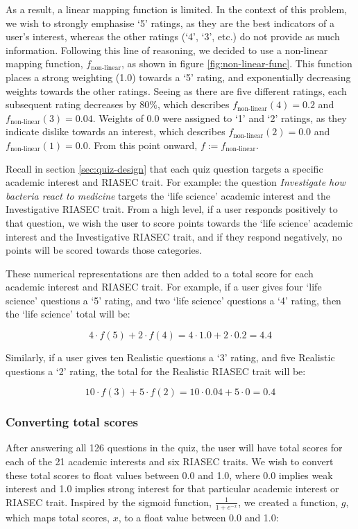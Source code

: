 As a result, a linear mapping function is limited.
In the context of this problem, we wish to strongly emphasise `5' ratings, as they are the best indicators of a user's interest,
whereas the other ratings (`4', `3', etc.) do not provide as much information.
Following this line of reasoning, we decided to use a non-linear mapping function, $f_{\text{non-linear}}$, as shown in figure \ref{fig:non-linear-func}.
This function places a strong weighting (1.0) towards a `5' rating, 
and exponentially decreasing weights towards the other ratings.
Seeing as there are five different ratings, each subsequent rating decreases by 80\%,
which describes $f_{\text{non-linear}}(4)=0.2$ and $f_{\text{non-linear}}(3)=0.04$.
Weights of $0.0$ were assigned to `1' and `2' ratings, as they indicate dislike towards an interest, 
which describes $f_{\text{non-linear}}(2)=0.0$ and $f_{\text{non-linear}}(1)=0.0$.
From this point onward, $f := f_{\text{non-linear}}$.

Recall in section \ref{sec:quiz-design} that each quiz question targets a specific academic interest and RIASEC trait.
For example: the question \emph{Investigate how bacteria react to medicine} targets the `life science' academic interest and the Investigative RIASEC trait.
From a high level, if a user responds positively to that question, we wish the user to score points towards the `life science' academic interest and the Investigative RIASEC trait,
and if they respond negatively, no points will be scored towards those categories.

These numerical representations are then added to a total score for each academic interest and RIASEC trait.
For example, if a user gives four `life science' questions a `5' rating,
and two `life science' questions a `4' rating, then the `life science' total will be:

\[4 \cdot f(5) + 2 \cdot f(4) = 4 \cdot 1.0 + 2 \cdot 0.2 = 4.4\]

Similarly, if a user gives ten Realistic questions a `3' rating, and five Realistic questions a `2' rating, 
the total for the Realistic RIASEC trait will be:

\[10 \cdot f(3) + 5 \cdot f(2) = 10 \cdot 0.04 + 5 \cdot 0 = 0.4\]

\subsubsection{Converting total scores}

After answering all 126 questions in the quiz, the user will have total scores for each of the 21 academic interests and six RIASEC traits.
We wish to convert these total scores to float values between 0.0 and 1.0, where 0.0 implies weak interest and 1.0 implies strong interest for that particular academic interest or RIASEC trait.
Inspired by the sigmoid function, $\frac{1}{1+e^{-x}}$, we 
created a function, $g$,
which maps total scores, $x$, to a float value between 0.0 and 1.0:

